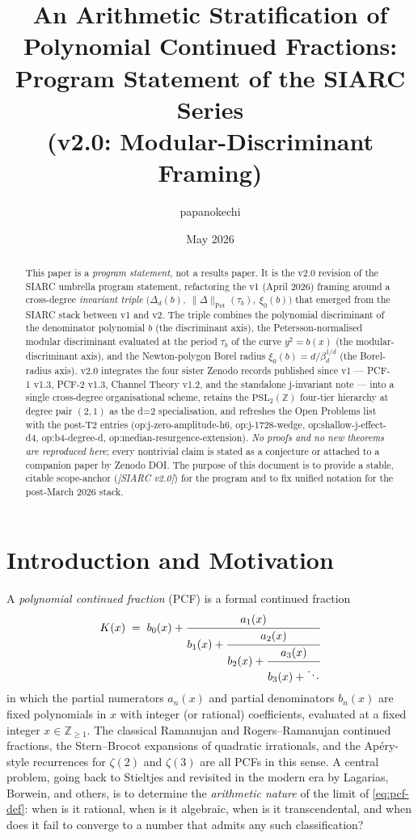 \documentclass[11pt,a4paper]{article}
\title{An Arithmetic Stratification of Polynomial Continued Fractions:\\
       Program Statement of the SIARC Series\\
       \large (v2.0: Modular-Discriminant Framing)}
\author{papanokechi}
\date{May 2026}
\theoremstyle{definition}
\theoremstyle{remark}
\newcommand{\PSLZ}{\mathrm{PSL}_2(\mathbb{Z})}
\newcommand{\Z}{\mathbb{Z}}
\newcommand{\PetN}[1]{\lVert #1 \rVert_{\mathrm{Pet}}}
\begin{document}
\maketitle

\begin{abstract}
This paper is a \emph{program statement}, not a results paper. It is the
v2.0 revision of the SIARC umbrella program statement, refactoring the
v1 (April 2026) framing around a cross-degree \emph{invariant triple}
\(\bigl(\Delta_d(b),\ \PetN{\Delta}(\tau_b),\ \xi_0(b)\bigr)\) that
emerged from the SIARC stack between v1 and v2. The triple combines
the polynomial discriminant of the denominator polynomial \(b\) (the
discriminant axis), the Petersson-normalised modular discriminant
evaluated at the period \(\tau_b\) of the curve \(y^2 = b(x)\) (the
modular-discriminant axis), and the Newton-polygon Borel radius
\(\xi_0(b) = d/\beta_d^{1/d}\) (the Borel-radius axis). v2.0 integrates
the four sister Zenodo records published since v1 --- PCF-1 v1.3,
PCF-2 v1.3, Channel Theory v1.2, and the standalone j-invariant
note --- into a single cross-degree organisational scheme, retains the
$\PSLZ$ four-tier hierarchy at degree pair \((2,1)\) as the d=2
specialisation, and refreshes the Open Problems list with the
post-T2 entries (\textsf{op:j-zero-amplitude-h6},
\textsf{op:j-1728-wedge}, \textsf{op:shallow-j-effect-d4},
\textsf{op:b4-degree-d}, \textsf{op:median-resurgence-extension}).
\emph{No proofs and no new theorems are reproduced here}; every
nontrivial claim is stated as a conjecture or attached to a companion
paper by Zenodo DOI. The purpose of this document is to provide a
stable, citable scope-anchor (\emph{[SIARC v2.0]}) for the program
and to fix unified notation for the post-March 2026 stack.
\end{abstract}

\tableofcontents

\section{Introduction and Motivation}
\label{sec:intro}

A \emph{polynomial continued fraction} (PCF) is a formal continued fraction
\begin{equation}
  \label{eq:pcf-def}
  K(x) \;=\; b_0(x) + \cfrac{a_1(x)}{b_1(x) + \cfrac{a_2(x)}{b_2(x) + \cfrac{a_3(x)}{b_3(x) + \ddots}}}
\end{equation}
in which the partial numerators $a_n(x)$ and partial denominators $b_n(x)$
are fixed polynomials in $x$ with integer (or rational) coefficients, evaluated
at a fixed integer $x \in \Z_{\geq 1}$. The classical Ramanujan and
Rogers--Ramanujan continued fractions, the Stern--Brocot expansions of
quadratic irrationals, and the Apéry-style recurrences for $\zeta(2)$ and
$\zeta(3)$ are all PCFs in this sense. A central problem, going back to
Stieltjes and revisited in the modern era by Lagarias, Borwein, and others,
is to determine the \emph{arithmetic nature} of the limit of \eqref{eq:pcf-def}:
when is it rational, when is it algebraic, when is it transcendental, and
when does it fail to converge to a number that admits any such classification?
\end{document}
